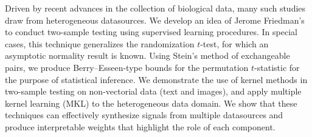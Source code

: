 Driven by recent advances in the collection of biological data,
many such studies draw from heterogeneous datasources.  We develop
an idea of Jerome Friedman's to conduct two-sample testing using
supervised learning procedures.  In special cases, this technique
generalizes the randomization $t$-test, for which an asymptotic
normality result is known.  Using Stein's method of exchangeable
pairs, we produce Berry--Esseen-type bounds for the permutation
$t$-statistic for the purpose of statistical inference.  We demonstrate
the use of kernel methods in two-sample testing on non-vectorial data
(text and images), and apply multiple kernel learning (MKL) to the
heterogeneous data domain.  We show that these techniques can
effectively synthesize signals from multiple datasources and produce
interpretable weights that highlight the role of each component.
